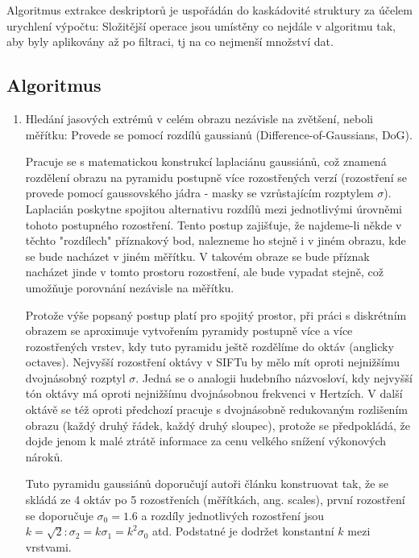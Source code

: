 	Algoritmus extrakce deskriptorů je uspořádán do kaskádovité struktury  za účelem urychlení výpočtu: Složitější operace jsou umístěny co  nejdále v algoritmu tak, aby byly aplikovány až po filtraci, tj na co nejmenší množství dat.
	
	\subsection{Algoritmus}
	
	\begin{enumerate}
		\item Hledání jasových extrémů v celém obrazu nezávisle na zvětšení, neboli měřítku: Provede se pomocí rozdílů gaussianů (Difference-of-Gaussians, DoG).
		
			Pracuje se s matematickou konstrukcí laplaciánu gaussiánů, což znamená rozdělení obrazu na pyramidu postupně více rozostřených verzí (rozostření se provede pomocí gaussovského jádra - masky se vzrůstajícím rozptylem $\sigma{}$). Laplacián poskytne spojitou alternativu rozdílů mezi jednotlivými úrovněmi tohoto postupného rozostření. Tento postup zajišťuje, že najdeme-li někde v těchto "rozdílech" příznakový bod, nalezneme ho stejně i v jiném obrazu, kde se bude nacházet v jiném měřítku. V takovém obraze se bude příznak nacházet jinde v tomto prostoru rozostření, ale bude vypadat stejně, což umožňuje porovnání nezávisle na měřítku.
			
			Protože výše popsaný postup platí pro spojitý prostor, při práci s diskrétním obrazem se aproximuje vytvořením pyramidy postupně více a více rozostřených vrstev, kdy tuto pyramidu ještě rozdělíme do oktáv (anglicky octaves). Nejvyšší rozostření oktávy v SIFTu by mělo mít oproti nejnižšímu dvojnásobný rozptyl $\sigma$. Jedná se o analogii hudebního názvosloví, kdy nejvyšší tón oktávy má oproti nejnižšímu dvojnásobnou frekvenci v Hertzích. V další oktávě se též oproti předchozí pracuje s dvojnásobně redukovaným rozlišením obrazu (každý druhý řádek, každý druhý sloupec), protože se předpokládá, že dojde jenom k malé ztrátě informace za cenu velkého snížení výkonových nároků.
			
			Tuto pyramidu gaussiánů doporučují autoři článku \cite{lowe2004distinctive} konstruovat tak, že se skládá ze 4 oktáv po 5 rozostřeních (měřítkách, ang. scales), první rozostření se doporučuje $\sigma_0 = 1.6$ a rozdíly jednotlivých rozostření jsou $k=\sqrt{2}: \sigma_2 = k \sigma_1 = k^2 \sigma_0$ atd. Podstatné je dodržet konstantní $k$ mezi vrstvami.
			

\end{enumerate}
